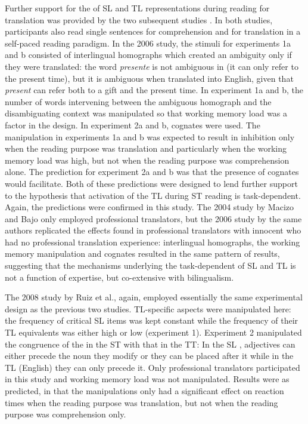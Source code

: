 \documentclass[output=paper]{LSP/langsci}
\begin{document}
Further support for the  of SL and TL representations during reading for translation was provided by the two subsequent studies \citep{Macizo2006b,Ruiz2008Activation}. In both studies, participants also read single sentences for comprehension and for translation in a self-paced reading paradigm. In the 2006 study, the stimuli for experiments 1a and b consisted of interlingual homographs which created an ambiguity only if they were translated: the  word \textit{presente} is not ambiguous in  (it can only refer to the present time), but it is ambiguous when translated into English, given that \textit{present} can refer both to a gift and the present time. In experiment 1a and b, the number of words intervening between the ambiguous homograph and the disambiguating context was manipulated so that working memory load was a factor in the design. In experiment 2a and b, cognates were used. The manipulation in experiments 1a and b was expected to result in inhibition only when the reading purpose was translation and particularly when the working memory load was high, but not when the reading purpose was comprehension alone. The prediction for experiment 2a and b was that the presence of cognates would facilitate. Both of these predictions were designed to lend further support to the hypothesis that activation of the TL during ST reading is task-dependent. Again, the predictions were confirmed in this study. The 2004 study by Macizo and Bajo only employed professional translators, but the 2006 study by the same authors replicated the effects found in professional translators with innocent  who had no professional translation experience: interlingual homographs, the working memory manipulation and cognates resulted in the same pattern of results, suggesting that the mechanisms underlying the task-dependent  of SL and TL is not a function of expertise, but co-extensive with bilingualism.

The 2008 study by Ruiz et al., again, employed essentially the same experimental design as the previous two studies. TL-specific aspects were manipulated here: the frequency of critical SL items was kept constant while the frequency of their TL equivalents was either high or low (experiment 1). Experiment 2 manipulated the congruence of the  in the ST with that in the TT: In the SL , adjectives can either precede the noun they modify or they can be placed after it while in the TL (English) they can only precede it. Only professional translators participated in this study and working memory load was not manipulated. Results were as predicted, in that the manipulations only had a significant effect on reaction times when the reading purpose was translation, but not when the reading purpose was comprehension only.
\end{document}
